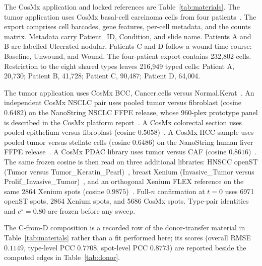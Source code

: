 The CosMx application and locked references are Table~\ref{tab:materials}. The tumor application uses CosMx basal-cell carcinoma cells from four patients~\citep{Andreatta2024zenodo,Yerly2022,Yerly2025preprint}. The export comprises cell barcodes, gene features, per-cell metadata, and the counts matrix. Metadata carry Patient\_ID, Condition, and slide name. Patients A and B are labelled Ulcerated nodular. Patients C and D follow a wound time course: Baseline, Unwound, and Wound. The four-patient export contains 232{,}802 cells. Restriction to the eight shared types leaves 216{,}949 typed cells: Patient A, 20{,}730; Patient B, 41{,}728; Patient C, 90{,}487; Patient D, 64{,}004.

The tumor application uses CosMx BCC, Cancer.cells versus Normal.Kerat~\citep{He2022,Andreatta2024zenodo}. An independent CosMx NSCLC pair uses pooled tumor versus fibroblast (cosine \(0.6482\)) on the NanoString NSCLC FFPE release, whose 960-plex prototype panel is described in the CosMx platform report~\citep{He2022,Sun2025spatial}. A CosMx colorectal section uses pooled epithelium versus fibroblast (cosine \(0.5058\))~\citep{Crowell2025preprint}. A CosMx HCC sample uses pooled tumor versus stellate cells (cosine \(0.6486\)) on the NanoString human liver FFPE release~\citep{Sun2025spatial}. A CosMx PDAC library uses tumor versus CAF (cosine \(0.8616\))~\citep{Pei2025}. The same frozen cosine is then read on three additional libraries: HNSCC openST (Tumor versus Tumor\_Keratin\_Pearl)~\citep{Schott2024}, breast Xenium (Invasive\_Tumor versus Prolif\_Invasive\_Tumor)~\citep{Janesick2023}, and an orthogonal Xenium FLEX reference on the same 2864 Xenium spots (cosine \(0.9875\))~\citep{Janesick2023}. Full-\(n\) confirmation at \(t=0\) uses 6971 openST spots, 2864 Xenium spots, and 5686 CosMx spots. Type-pair identities and \(c^\star=0.80\) are frozen before any sweep.

The C-from-D composition is a recorded row of the donor-transfer material in Table~\ref{tab:materials} rather than a fit performed here; its scores (overall RMSE \(0.1149\), type-level PCC \(0.7708\), spot-level PCC \(0.8773\)) are reported beside the computed edges in Table~\ref{tab:donor}.
